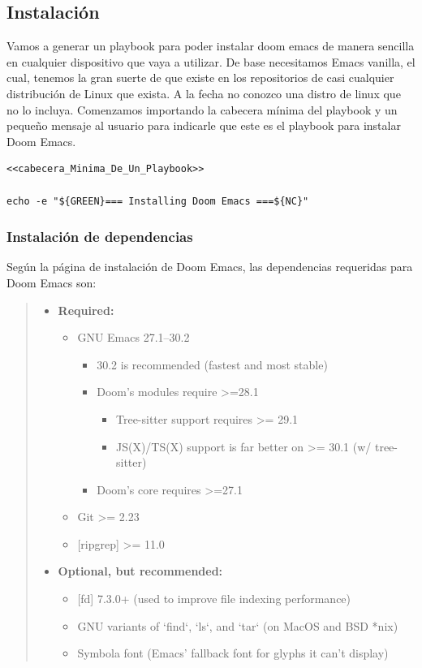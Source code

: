 \documentclass[11pt]{article}
\begin{document}
\subsection{Instalación}
\label{sec:org61bd40a}
Vamos a generar un playbook para poder instalar doom emacs de manera sencilla en cualquier dispositivo que vaya a utilizar.
De base necesitamos Emacs vanilla, el cual, tenemos la gran suerte de que existe en los repositorios de casi cualquier distribución de Linux que exista. A la fecha no conozco una distro de linux que no lo incluya.
Comenzamos importando la cabecera mínima del playbook y un pequeño mensaje al usuario para indicarle que este es el playbook para instalar Doom Emacs.

\begin{verbatim}
<<cabecera_Minima_De_Un_Playbook>>

echo -e "${GREEN}=== Installing Doom Emacs ===${NC}"

\end{verbatim}
\subsubsection{Instalación de dependencias}
\label{sec:org3034955}

Según la página de instalación de Doom Emacs, las dependencias requeridas para Doom Emacs son:
\begin{quote}
\begin{itemize}
\item \textbf{\textbf{Required:}}
\begin{itemize}
\item GNU Emacs 27.1–30.2
\begin{itemize}
\item 30.2 is recommended (fastest and most stable)
\item Doom's modules require >=28.1
\begin{itemize}
\item Tree-sitter support requires >= 29.1
\item JS(X)/TS(X) support is far better on >= 30.1 (w/ tree-sitter)
\end{itemize}
\item Doom's core requires >=27.1
\end{itemize}
\item Git >= 2.23
\item {[}ripgrep] >= 11.0
\end{itemize}
\item \textbf{\textbf{Optional, but recommended:}}
\begin{itemize}
\item {[}fd] 7.3.0+ (used to improve file indexing performance)
\item GNU variants of `find`, `ls`, and `tar` (on MacOS and BSD *nix)
\item Symbola font (Emacs' fallback font for glyphs it can't display)
\end{itemize}
\end{itemize}
\end{quote}
\end{document}
